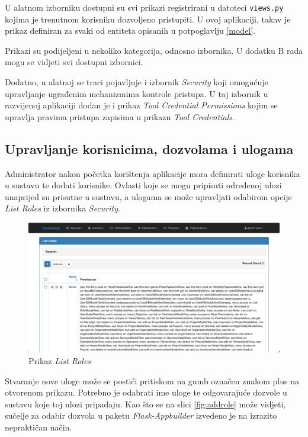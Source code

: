 \documentclass[times, utf8, diplomski]{fer}
\begin{document}
U alatnom izborniku dostupni su svi prikazi registrirani u datoteci
\texttt{views.py} kojima je trenutnom korisniku dozvoljeno pristupiti. U ovoj
aplikaciji, takav je prikaz definiran za svaki od entiteta opisanih u
potpoglavlju \ref{model}.

Prikazi su podijeljeni u nekoliko kategorija, odnosno izbornika. U dodatku B
rada mogu se vidjeti svi dostupni izbornici.

Dodatno, u alatnoj se traci pojavljuje i izbornik \emph{Security} koji omogućuje
upravljanje ugrađenim mehanizmima kontrole pristupa. U taj izbornik u razvijenoj
aplikaciji dodan je i prikaz \emph{Tool Credential Permissions} kojim se
upravlja pravima pristupa zapisima u prikazu \emph{Tool Credentials}.

\subsection{Upravljanje korisnicima, dozvolama i ulogama}

Administrator nakon početka korištenja aplikacije mora definirati uloge
korisnika u sustavu te dodati korisnike. Ovlasti koje se mogu pripisati
određenoj ulozi unaprijed su prisutne u sustavu, a ulogama se može upravljati
odabirom opcije \emph{List Roles} iz izbornika \emph{Security}.

\begin{figure}[H]
    \centering
    \includegraphics[width=1\textwidth]{slike/listroles.png}
    \caption{Prikaz \emph{List Roles}}
    \label{fig:listroles}
\end{figure}

Stvaranje nove uloge može se postići pritiskom na gumb označen znakom plus na
otvorenom prikazu. Potrebno je odabrati ime uloge te odgovarajuće dozvole u
sustavu koje toj ulozi pripadaju. Kao što se na slici \ref{fig:addrole} može
vidjeti, sučelje za odabir dozvola u paketu \emph{Flask-Appbuilder} izvedeno je
na izrazito nepraktičan način.
\end{document}
